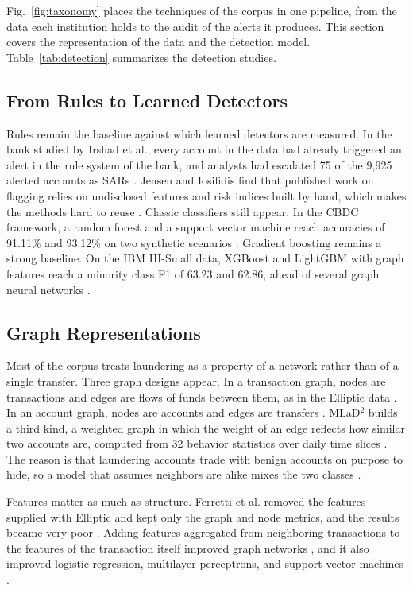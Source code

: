\documentclass[journal]{IEEEtran}
\begin{document}
Fig.~\ref{fig:taxonomy} places the techniques of the corpus in one pipeline, from the data each institution holds to the audit of the alerts it produces. This section covers the representation of the data and the detection model. Table~\ref{tab:detection} summarizes the detection studies.

\subsection{From Rules to Learned Detectors}

Rules remain the baseline against which learned detectors are measured. In the bank studied by Irshad et al., every account in the data had already triggered an alert in the rule system of the bank, and analysts had escalated 75 of the 9{,}925 alerted accounts as SARs \cite{irshad2024gcfmld}. Jensen and Iosifidis find that published work on flagging relies on undisclosed features and risk indices built by hand, which makes the methods hard to reuse \cite{jensen2023fighting}. Classic classifiers still appear. In the CBDC framework, a random forest and a support vector machine reach accuracies of 91.11\% and 93.12\% on two synthetic scenarios \cite{amber2026cbdc}. Gradient boosting remains a strong baseline. On the IBM HI-Small data, XGBoost and LightGBM with graph features reach a minority class F1 of 63.23 and 62.86, ahead of several graph neural networks \cite{mao2026pmegnn}.

\subsection{Graph Representations}

Most of the corpus treats laundering as a property of a network rather than of a single transfer. Three graph designs appear. In a transaction graph, nodes are transactions and edges are flows of funds between them, as in the Elliptic data \cite{ferretti2025gnn,yu2023aetransgat}. In an account graph, nodes are accounts and edges are transfers \cite{irshad2024gcfmld,mao2026pmegnn}. MLaD$^2$ builds a third kind, a weighted graph in which the weight of an edge reflects how similar two accounts are, computed from 32 behavior statistics over daily time slices \cite{luo2024mlad}. The reason is that laundering accounts trade with benign accounts on purpose to hide, so a model that assumes neighbors are alike mixes the two classes \cite{luo2024mlad}.

Features matter as much as structure. Ferretti et al. removed the features supplied with Elliptic and kept only the graph and node metrics, and the results became very poor \cite{ferretti2025gnn}. Adding features aggregated from neighboring transactions to the features of the transaction itself improved graph networks \cite{ferretti2025gnn}, and it also improved logistic regression, multilayer perceptrons, and support vector machines \cite{yu2023aetransgat}.
\end{document}
